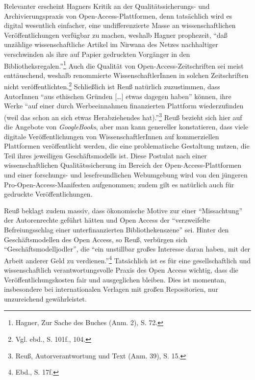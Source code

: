 \documentclass[a4paper,
fontsize=11pt,
oneside,
numbers=noperiodatend,
parskip=half-,
bibliography=totoc,
final
]{scrartcl}
\begin{document}
Relevanter erscheint Hagners Kritik an der Qualitätssicherungs- und
Archivierungspraxis von Open-Access-Plattformen, denn tatsächlich wird
es digital wesentlich einfacher, eine undifferenzierte Masse an
wissenschaftlichen Veröffentlichungen verfügbar zu machen, weshalb
Hagner prophezeit, \enquote{daß unzählige wissenschaftliche Artikel im
Nirwana des Netzes nachhaltiger verschwinden als ihre auf Papier
gedruckten Vorgänger in den Bibliotheksregalen.}\footnote{Hagner, Zur
  Sache des Buches (Anm. 2), S. 72.} Auch die Qualität von
Open-Access-Zeitschriften sei meist enttäuschend, weshalb renommierte
WissenschaftlerInnen in solchen Zeitschriften nicht
veröffentlichten.\footnote{Vgl. ebd., S. 101f., 104.} Schließlich ist
Reuß natürlich zuzustimmen, dass AutorInnen \enquote{aus ethischen
Gründen {[}\ldots{}{]} etwas dagegen haben} können, ihre Werke
\enquote{auf einer durch Werbeeinnahmen finanzierten Plattform
wiederzufinden (weil das schon an sich etwas Herabziehendes
hat).}\footnote{Reuß, Autorverantwortung und Text (Anm. 39), S. 15.}
Reuß bezieht sich hier auf die Angebote von \emph{GoogleBooks}, aber man
kann genereller konstatieren, dass viele digitale Veröffentlichungen von
WissenschaftlerInnen auf kommerziellen Plattformen veröffentlicht
werden, die eine problematische Gestaltung nutzen, die Teil ihres
jeweiligen Geschäftsmodells ist. Diese Postulat nach einer
wissenschaftlichen Qualitätssicherung im Bereich der
Open-Access-Plattformen und einer forschungs- und lesefreundlichen
Webumgebung wird von den jüngeren Pro-Open-Access-Manifesten
aufgenommen; zudem gilt es natürlich auch für gedruckte
Veröffentlichungen.

Reuß beklagt zudem massiv, dass ökonomische Motive zur einer
\enquote{Missachtung} der Autorenrechte geführt hätten und Open Access
der \enquote{verzweifelte Befreiungsschlag einer unterfinanzierten
Bibliothekenszene} sei. Hinter den Geschäftsmodellen des Open Access, so
Reuß, verbürgen sich \enquote{Geschäftsmodelljodler}, die \enquote{ein
unstillbar großes Interesse daran haben, mit der Arbeit anderer Geld zu
verdienen.}\footnote{Ebd., S. 17f.} Tatsächlich ist es für eine
gesellschaftlich und wissenschaftlich verantwortungsvolle Praxis des
Open Access wichtig, dass die Veröffentlichungskosten fair und
ausgeglichen bleiben. Dies ist momentan, insbesondere bei
internationalen Verlagen mit großen Repositorien, nur unzureichend
gewährleistet.
\end{document}
